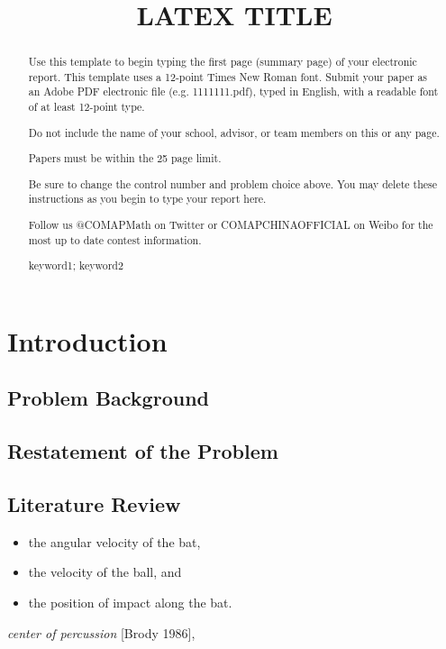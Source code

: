 \documentclass{mcmthesis}
\title{LATEX TITLE}
\begin{document}
	\begin{abstract}
		\par Use this template to begin typing the first page (summary page) of your electronic report. This template uses a 12-point Times New Roman font. Submit your paper as an Adobe PDF electronic file (e.g. 1111111.pdf), typed in English, with a readable font of at least 12-point type.
		
		Do not include the name of your school, advisor, or team members on this or any page.
		
		Papers must be within the 25 page limit.
		
		Be sure to change the control number and problem choice above.
		You may delete these instructions as you begin to type your report here.
		
		Follow us @COMAPMath on Twitter or COMAPCHINAOFFICIAL on Weibo for the most up to date contest information.
		
		\begin{keywords}
			keyword1; keyword2
		\end{keywords}
	\end{abstract}
	\maketitle
	\tableofcontents
	\newpage
	\section{Introduction}
	\subsection{Problem Background}
    \lipsum[3]
	\subsection{Restatement of the Problem}
	\lipsum[3]
	\subsection{Literature Review}
	\lipsum[3]
	\begin{itemize}
		\item the angular velocity of the bat,
		\item the velocity of the ball, and
		\item the position of impact along the bat.
	\end{itemize}
	\lipsum[4]
	\emph{center of percussion} [Brody 1986], \lipsum[5]
	
\end{document}
